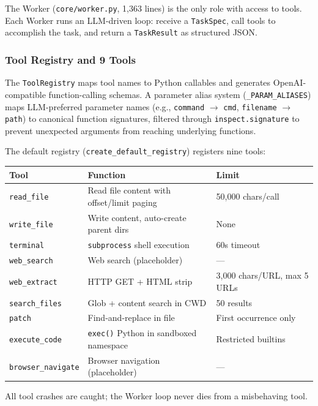 \documentclass[11pt,a4paper]{article}
\begin{document}
The Worker (\texttt{core/worker.py}, 1,363 lines) is the only role with
access to tools. Each Worker runs an LLM-driven loop: receive a
\texttt{TaskSpec}, call tools to accomplish the task, and return a
\texttt{TaskResult} as structured JSON.

\subsubsection*{Tool Registry and 9 Tools}

The \texttt{ToolRegistry} maps tool names to Python callables and generates
OpenAI-compatible function-calling schemas. A parameter alias system
(\texttt{\_PARAM\_ALIASES}) maps LLM-preferred parameter names (e.g.,
\texttt{command} $\rightarrow$ \texttt{cmd}, \texttt{filename} $\rightarrow$
\texttt{path}) to canonical function signatures, filtered through
\texttt{inspect.signature} to prevent unexpected arguments from reaching
underlying functions.

The default registry (\texttt{create\_default\_registry}) registers nine tools:

\begin{center}
\begin{tabular}{lll}
\toprule
\textbf{Tool} & \textbf{Function} & \textbf{Limit} \\
\midrule
\texttt{read\_file} & Read file content with offset/limit paging & 50,000 chars/call \\
\texttt{write\_file} & Write content, auto-create parent dirs & None \\
\texttt{terminal} & \texttt{subprocess} shell execution & 60s timeout \\
\texttt{web\_search} & Web search (placeholder) & --- \\
\texttt{web\_extract} & HTTP GET + HTML strip & 3,000 chars/URL, max 5 URLs \\
\texttt{search\_files} & Glob + content search in CWD & 50 results \\
\texttt{patch} & Find-and-replace in file & First occurrence only \\
\texttt{execute\_code} & \texttt{exec()} Python in sandboxed namespace & Restricted builtins \\
\texttt{browser\_navigate} & Browser navigation (placeholder) & --- \\
\bottomrule
\end{tabular}
\end{center}

All tool crashes are caught; the Worker loop never dies from a misbehaving tool.
\end{document}

